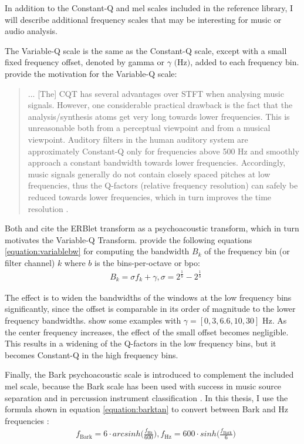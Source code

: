 \documentclass[report.tex]{subfiles}
\begin{document}
In addition to the Constant-Q and mel scales included in the reference library, I will describe additional frequency scales that may be interesting for music or audio analysis.

The Variable-Q scale \parencite{variableq1, variableq2} is the same as the Constant-Q scale, except with a small fixed frequency offset, denoted by gamma or $\gamma \text{ (Hz)}$, added to each frequency bin. \citeauthor{variableq1} provide the motivation for the Variable-Q scale:
\begin{quote}
	... [The] CQT has several advantages over STFT when analysing music signals. However, one considerable practical drawback is the fact that the analysis/synthesis atoms get very long towards lower frequencies. This is unreasonable both from a perceptual viewpoint and from a musical viewpoint. Auditory filters in the human auditory system are approximately Constant-Q only for frequencies above 500 Hz and smoothly approach a constant bandwidth towards lower frequencies. Accordingly, music signals generally do not contain closely spaced pitches at low frequencies, thus the Q-factors (relative frequency resolution) can safely be reduced towards lower frequencies, which in turn improves the time resolution \parencite[5]{variableq1}.
\end{quote}

Both \textcite{variableq1} and \textcite{variableq2} cite the ERBlet transform \parencite{erblet} as a psychoacoustic transform, which in turn motivates the Variable-Q Transform. \textcite{variableq1, variableq2} provide the following equations \eqref{equation:variablebw} for computing the bandwidth $B_{k}$ of the frequency bin (or filter channel) $k$ where $b$ is the bins-per-octave or bpo:
\begin{align}\tag{16}\label{equation:variablebw}
	\nonumber & B_{k} = \sigma f_{k} + \gamma, \sigma = 2^{\frac{1}{b}} - 2^{\frac{1}{b}}
\end{align}

The effect is to widen the bandwidths of the windows at the low frequency bins significantly, since the offset is comparable in its order of magnitude to the lower frequency bandwidths. \textcite{variableq1} show some examples with $\gamma = [0, 3, 6.6, 10, 30] \text{ Hz}$. As the center frequency increases, the effect of the small offset becomes negligible. This results in a widening of the Q-factors in the low frequency bins, but it becomes Constant-Q in the high frequency bins. 

Finally, the Bark psychoacoustic scale is introduced to complement the included mel scale, because the Bark scale has been used with success in music source separation \parencite{barkjust1} and in percussion instrument classification \parencite{barkjust2}. In this thesis, I use the formula shown in equation \eqref{equation:barktan} to convert between Bark and Hz frequencies \parencite{barktan}:
\begin{align}\tag{17}\label{equation:barktan}
	\nonumber & f_{\text{Bark}} = 6 \cdot arcsinh \Big(\frac{f_{\text{Hz}}}{600}\Big), f_{\text{Hz}} = 600 \cdot sinh \Big(\frac{f_{\text{Bark}}}{6}\Big)
\end{align}
\end{document}
